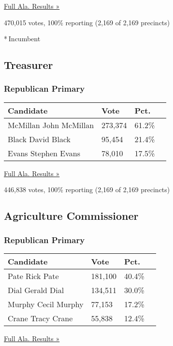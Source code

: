 \href{https://www.nytimes3xbfgragh.onion/elections/results/alabama}{Full
Ala. Results »}

470,015 votes, 100\% reporting (2,169 of 2,169 precincts)

* Incumbent

\hypertarget{treasurer}{%
\subsection{Treasurer}\label{treasurer}}

\hypertarget{republican-primary-11}{%
\subsubsection{Republican Primary}\label{republican-primary-11}}

\begin{longtable}[]{@{}llll@{}}
\toprule
Candidate & Vote & Pct. &\tabularnewline
\midrule
\endhead
 McMillan John McMillan & 273,374 & 61.2\% &\tabularnewline
 Black David Black & 95,454 & 21.4\% &\tabularnewline
 Evans Stephen Evans & 78,010 & 17.5\% &\tabularnewline
\bottomrule
\end{longtable}

\href{https://www.nytimes3xbfgragh.onion/elections/results/alabama}{Full
Ala. Results »}

446,838 votes, 100\% reporting (2,169 of 2,169 precincts)

\hypertarget{agriculture-commissioner}{%
\subsection{Agriculture Commissioner}\label{agriculture-commissioner}}

\hypertarget{republican-primary-12}{%
\subsubsection{Republican Primary}\label{republican-primary-12}}

\begin{longtable}[]{@{}llll@{}}
\toprule
Candidate & Vote & Pct. &\tabularnewline
\midrule
\endhead
 Pate Rick Pate & 181,100 & 40.4\% &\tabularnewline
 Dial Gerald Dial & 134,511 & 30.0\% &\tabularnewline
 Murphy Cecil Murphy & 77,153 & 17.2\% &\tabularnewline
 Crane Tracy Crane & 55,838 & 12.4\% &\tabularnewline
\bottomrule
\end{longtable}

\href{https://www.nytimes3xbfgragh.onion/elections/results/alabama}{Full
Ala. Results »}

